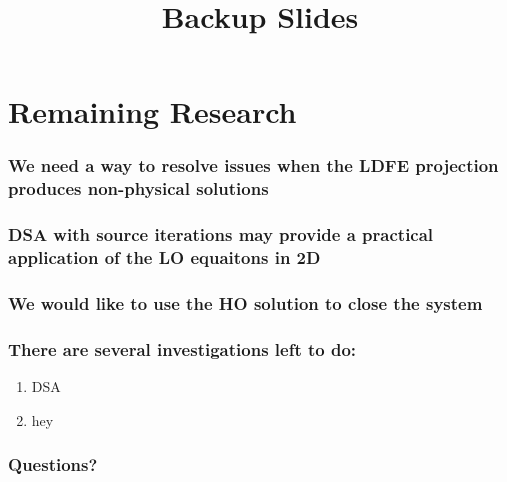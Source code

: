 \documentclass[xcolor=dvipsnames,hyperref={pdfpagelabels=false},unknownkeysallowed]{beamer}
\newcommand{\coly}[1]{{\color{yellow} #1}}
\newcommand{\colb}[1]{{\color{blue} #1}}
\newlength{\wideitemsep}
\let\olditem\item
\renewcommand{\item}{\setlength{\itemsep}{\wideitemsep}\olditem}
\begin{document}
\section{Remaining Research}
\begin{frame}
    \frametitle{We need a way to resolve issues when the LDFE projection produces non-physical solutions}
\end{frame}

\begin{frame}
    \frametitle{DSA with source iterations may provide a practical application of the LO equaitons in 2D}

\end{frame}

\begin{frame}
    \frametitle{We would like to use the HO solution to close the system}

\end{frame}


\begin{frame}
    \frametitle{\colb{There are several investigations left to do:}}
        \begin{enumerate}
            \item DSA
            \item hey
        \end{enumerate}
    \end{frame}

\date{}
\begin{frame}
    \frametitle{{\LARGE\coly{Questions?}}}
    \vspace{-0.21in}
    \titlepage \vspace{-0.2113in}
\end{frame}

\appendix
{}
\setcounter{finalframe}{\value{framenumber}}

\title{Backup Slides}
\author{}
\date{}
\end{document}
